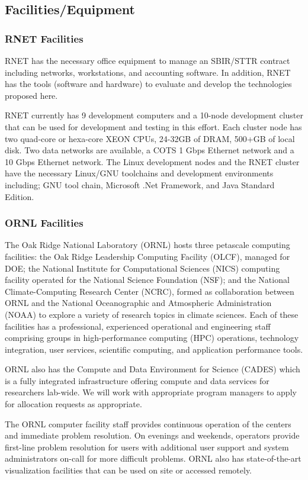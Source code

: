\subsection{Facilities/Equipment}
\subsubsection{RNET Facilities}
RNET has the necessary office equipment to manage an SBIR/STTR contract
including networks, workstations, and accounting software. In
addition, RNET has the tools (software and hardware) to evaluate and
develop the technologies proposed here.  

RNET currently has 9 development computers and a 10-node development cluster 
that can be used for development and testing in this effort. Each cluster node 
has two quad-core or hexa-core XEON CPUs, 24-32GB of DRAM, 500+GB of local 
disk. 
Two data networks are available, a COTS 1 Gbps Ethernet network and a 10 Gbps 
Ethernet network. The Linux development nodes and the RNET cluster have the 
necessary Linux/GNU toolchains and development environments including; GNU 
tool chain, Microsoft .Net Framework, and Java Standard Edition.

\subsubsection{ORNL Facilities}
The Oak Ridge National Laboratory (ORNL) hosts three petascale computing 
facilities: the Oak Ridge Leadership Computing 
Facility (OLCF), managed for DOE; the National Institute for Computational 
Sciences (NICS) computing facility operated 
for the National Science Foundation (NSF); and the National Climate-Computing 
Research Center (NCRC), formed as 
collaboration between ORNL and the National Oceanographic and Atmospheric 
Administration (NOAA) to explore a variety of 
research topics in climate sciences. Each of these facilities has a 
professional, experienced operational and engineering 
staff comprising groups in high-performance computing (HPC) operations, 
technology integration, user services, scientific 
computing, and application performance tools.

ORNL also has the Compute and Data Environment for Science (CADES) which is a 
fully integrated infrastructure offering compute and data services for 
researchers lab-wide. We will work with appropriate program managers to apply 
for allocation requests as appropriate.


 The ORNL computer facility staff 
provides continuous operation of the centers 
and immediate problem resolution. On evenings and weekends, operators provide 
first-line problem resolution for users with 
additional user support and system administrators on-call for more difficult 
problems. ORNL also has state-of-the-art 
visualization facilities that can be used on site or accessed remotely. 

